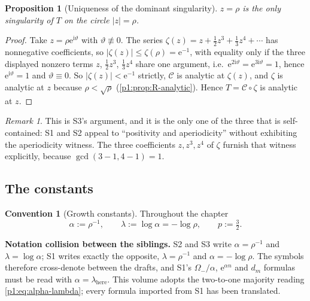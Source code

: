 \documentclass[11pt,a4paper,oneside]{book}
\theoremstyle{plain}
\newtheorem{proposition}[theorem]{Proposition}
\theoremstyle{definition}
\newtheorem{convention}[theorem]{Convention}
\theoremstyle{remark}
\newtheorem{remark}[theorem]{Remark}
\newcommand{\e}{\mathrm{e}}
\newcommand{\ii}{\mathrm{i}}
\begin{document}
\begin{proposition}[Uniqueness of the dominant singularity]
\label{p1:prop:unique-dominant}
$z=\rho$ is the only singularity of $T$ on the circle $|z|=\rho$.
\end{proposition}

\begin{proof}
Take $z=\rho\e^{\ii\vartheta}$ with $\vartheta\not\equiv0$.  The series
$\zeta(z)=z+\tfrac12z^3+\tfrac13z^4+\cdots$ has nonnegative coefficients, so
$|\zeta(z)|\le\zeta(\rho)=\e^{-1}$, with equality only if the three displayed nonzero terms
$z$, $\tfrac12z^3$, $\tfrac13z^4$ share one argument, i.e.\
$\e^{2\ii\vartheta}=\e^{3\ii\vartheta}=1$, hence $\e^{\ii\vartheta}=1$ and $\vartheta\equiv0$.
So $|\zeta(z)|<\e^{-1}$ strictly, $\mathcal C$ is analytic at $\zeta(z)$, and $\zeta$ is
analytic at $z$ because $\rho<\sqrt\rho$ (\cref{p1:prop:R-analytic}).  Hence $T=\mathcal
C\circ\zeta$ is analytic at $z$.
\end{proof}

\begin{remark}
This is \textsf{S3}'s argument, and it is the only one of the three that is self-contained:
\textsf{S1} and \textsf{S2} appeal to ``positivity and aperiodicity'' without exhibiting the
aperiodicity witness.  The three coefficients $z,z^3,z^4$ of $\zeta$ furnish that witness
explicitly, because $\gcd(3-1,4-1)=1$.
\end{remark}

\subsection{The constants}
\label{p1:sub:constants}

\begin{convention}[Growth constants]
\label{p1:def:constants}
Throughout the chapter
\begin{equation}
 \alpha:=\rho^{-1},\qquad \lambda:=\log\alpha=-\log\rho,\qquad p:=\tfrac32 .
 \label{p1:eq:alpha-lambda}
\end{equation}
\end{convention}

\begin{repairbox}
\textbf{Notation collision between the siblings.}  \textsf{S2} and \textsf{S3} write
$\alpha=\rho^{-1}$ and $\lambda=\log\alpha$; \textsf{S1} writes exactly the opposite,
$\lambda=\rho^{-1}$ and $\alpha=-\log\rho$.  The symbols therefore cross-denote between the
drafts, and \textsf{S1}'s $\Omega_-/\alpha$, $\e^{\alpha n}$ and $d_m$ formulas must be read
with $\alpha=\lambda_{\text{here}}$.  This volume adopts the two-to-one majority reading
\cref{p1:eq:alpha-lambda}; every formula imported from \textsf{S1} has been translated.
\end{repairbox}
\end{document}
